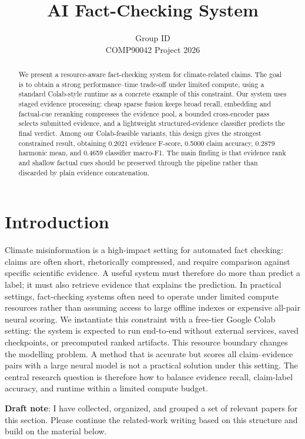 \documentclass[11pt]{article}
\title{AI Fact-Checking System}
\author{
  Group ID \\
  COMP90042 Project 2026
}
\begin{document}
\raggedbottom
\maketitle

\begin{abstract}
We present a resource-aware fact-checking system for climate-related claims.
The goal is to obtain a strong performance--time trade-off under limited
compute, using a standard Colab-style runtime as a concrete example of this
constraint.  Our system uses staged evidence processing: cheap sparse fusion
keeps broad recall, embedding and factual-cue reranking compresses the evidence
pool, a bounded cross-encoder pass selects submitted evidence, and a lightweight
structured-evidence classifier predicts the final verdict.  Among our
Colab-feasible variants, this design gives the strongest constrained result,
obtaining 0.2021 evidence F-score, 0.5000 claim accuracy, 0.2879 harmonic mean,
and 0.4659 classifier macro-F1.  The main finding is that evidence rank and
shallow factual cues should be preserved through the pipeline rather than
discarded by plain evidence concatenation.
\end{abstract}

\section{Introduction}

Climate misinformation is a high-impact setting for automated fact checking:
claims are often short, rhetorically compressed, and require comparison against
specific scientific evidence.  A useful system must therefore do more than
predict a label; it must also retrieve evidence that explains the prediction.
In practical settings, fact-checking systems often need to operate under limited
compute resources rather than assuming access to large offline indexes or
expensive all-pair neural scoring.  We instantiate this constraint with a
free-tier Google Colab setting: the system is expected to run end-to-end without
external services, saved checkpoints, or precomputed ranked artifacts.  This
resource boundary changes the modelling problem.  A method that is accurate but
scores all claim--evidence pairs with a large neural model is not a practical
solution under this setting.  The central research question is therefore how to
balance evidence recall, claim-label accuracy, and runtime within a limited
compute budget.

\textbf{Draft note}: I have collected, organized, and grouped a set of
relevant papers for this section.  Please continue the related-work writing
based on this structure and build on the material below.
\end{document}
